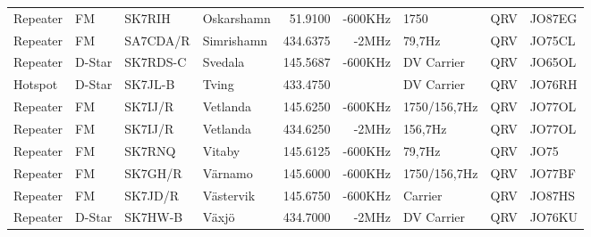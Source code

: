 \begin{landscape}
\begin{longtable}{llllrrlcl}
	Repeater          & FM           & SK7RIH        & Oskarshamn          &           51.9100 &        -600KHz & 1750            &       QRV       & JO87EG           \\
	Repeater          & FM           & SA7CDA/R      & Simrishamn          &          434.6375 &          -2MHz & 79,7Hz          &       QRV       & JO75CL           \\
	Repeater          & D-Star       & SK7RDS-C      & Svedala             &          145.5687 &        -600KHz & DV Carrier      &       QRV       & JO65OL           \\
	Hotspot           & D-Star       & SK7JL-B       & Tving               &          433.4750 &                & DV Carrier      &       QRV       & JO76RH           \\
	Repeater          & FM           & SK7IJ/R       & Vetlanda            &          145.6250 &        -600KHz & 1750/156,7Hz    &       QRV       & JO77OL           \\
	Repeater          & FM           & SK7IJ/R       & Vetlanda            &          434.6250 &          -2MHz & 156,7Hz         &       QRV       & JO77OL           \\
	Repeater          & FM           & SK7RNQ        & Vitaby              &          145.6125 &        -600KHz & 79,7Hz          &       QRV       & JO75             \\
	Repeater          & FM           & SK7GH/R       & Värnamo             &          145.6000 &        -600KHz & 1750/156,7Hz    &       QRV       & JO77BF           \\
	Repeater          & FM           & SK7JD/R       & Västervik           &          145.6750 &        -600KHz & Carrier         &       QRV       & JO87HS           \\
	Repeater          & D-Star       & SK7HW-B       & Växjö               &          434.7000 &          -2MHz & DV Carrier      &       QRV       & JO76KU
\end{longtable}
\normalsize

\end{landscape}
